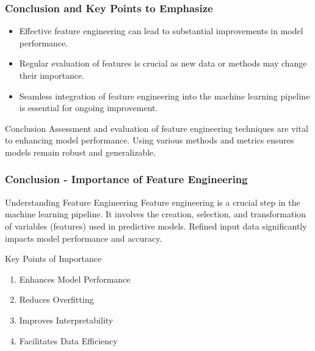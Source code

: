 \documentclass[aspectratio=169]{beamer}
\begin{document}
\begin{frame}[fragile]
    \frametitle{Conclusion and Key Points to Emphasize}
    \begin{itemize}
        \item Effective feature engineering can lead to substantial improvements in model performance.
        \item Regular evaluation of features is crucial as new data or methods may change their importance.
        \item Seamless integration of feature engineering into the machine learning pipeline is essential for ongoing improvement.
    \end{itemize}
    
    \begin{block}{Conclusion}
        Assessment and evaluation of feature engineering techniques are vital to enhancing model performance. Using various methods and metrics ensures models remain robust and generalizable.
    \end{block}
\end{frame}

\begin{frame}[fragile]
    \frametitle{Conclusion - Importance of Feature Engineering}
    \begin{block}{Understanding Feature Engineering}
        Feature engineering is a crucial step in the machine learning pipeline. It involves the creation, selection, and transformation of variables (features) used in predictive models. Refined input data significantly impacts model performance and accuracy.
    \end{block}
    
    \begin{block}{Key Points of Importance}
        \begin{enumerate}
            \item Enhances Model Performance
            \item Reduces Overfitting
            \item Improves Interpretability
            \item Facilitates Data Efficiency
        \end{enumerate}
    \end{block}
\end{frame}
\end{document}
